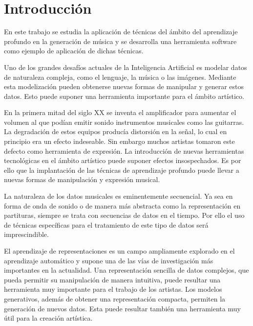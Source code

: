 %


\chapter{Introducción}

En este trabajo se estudia la aplicación de técnicas del ámbito del aprendizaje profundo en la generación de música y se desarrolla una herramienta software como ejemplo de aplicación de dichas técnicas.

Uno de los grandes desafíos actuales de la Inteligencia Artificial es modelar datos de naturaleza compleja, como el lenguaje, la música o las imágenes. Mediante esta modelización pueden obtenerse nuevas formas de manipular y generar estos datos. Esto puede suponer una herramienta importante para el ámbito artístico.

En la primera mitad del siglo XX se inventa el amplificador para aumentar el volumen al que podían emitir sonido instrumentos musicales como las guitarras. La degradación de estos equipos producía distorsión en la señal, lo cual en principio era un efecto indeseable. Sin embargo muchos artistas tomaron este defecto como herramienta de expresión. La introducción de nuevas herramientas tecnológicas en el ámbito artístico puede suponer efectos insospechados. Es por ello que la implantación de las técnicas de aprendizaje profundo puede llevar a nuevas formas de manipulación y expresión musical.

La naturaleza de los datos musicales es eminentemente secuencial. Ya sea en forma de onda de sonido o de manera más abstracta como la representación en partituras, siempre se trata con secuencias de datos en el tiempo. Por ello el uso de técnicas específicas para el tratamiento de este tipo de datos será imprescindible.

El aprendizaje de representaciones es un campo ampliamente explorado en el aprendizaje automático y supone una de las vías de investigación más importantes en la actualidad. Una representación sencilla de datos complejos, que pueda permitir su manipulación de manera intuitiva, puede resultar una herramienta muy importante para el trabajo de los artistas. Los modelos generativos, además de obtener una representación compacta, permiten la generación de nuevos datos. Esta puede resultar también una herramienta muy útil para la creación artística.

